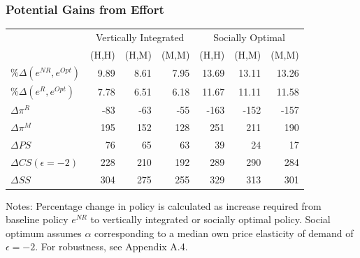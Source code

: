\begin{frame}
\frametitle{Potential Gains from Effort}
\begin{table}[htp]
\begin{center}
\begin{tabular}{|l | r r r | r r r |}
\hline
&  \multicolumn{3}{c|}{Vertically Integrated}& \multicolumn{3}{c|}{Socially Optimal}\\ 
 & (H,H) & (H,M) & (M,M)  & (H,H) & (H,M) & (M,M) \\ \hline
$\%\Delta(e^{NR}, e^{Opt})$ & 9.89 & 8.61 & 7.95 & 13.69 & 13.11 & 13.26 \\
$\%\Delta(e^{R}, e^{Opt})$ & 7.78 & 6.51 & 6.18 & 11.67 & 11.11 & 11.58 
 \\ \hline
$\Delta \pi^R$ & -83 & -63 & -55 & -163 & -152 & -157 \\
$\Delta \pi^M$ & 195 & 152 & 128 & 251 & 211 & 190 \\
$\Delta PS$ & 76 & 65 & 63 & 39 & 24 & 17 \\
$\Delta CS  (\epsilon=-2)$ & 228 & 210 & 192 & 289 & 290 & 284 \\
$\Delta SS$ & 304 & 275 & 255 & 329 & 313 & 301 \\ \hline
\end{tabular} 
\end{center}
\label{tab:effortnew}
\footnotesize
Notes: Percentage change in policy is calculated as increase required from baseline policy $e^{NR}$ to vertically integrated or socially optimal policy. Social optimum assumes $\alpha$ corresponding to a median own price elasticity of demand of $\epsilon=-2$. For robustness, see Appendix A.4.
\end{table}
\end{frame}





